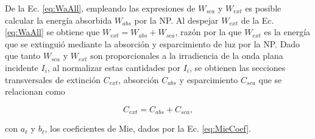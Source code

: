 De la Ec. \eqref{eq:WaAll}, empleando las expresiones de $W_{sca}$ y $W_{ext}$ es posible calcular la energía absorbida $W_{abs}$ por la NP. Al despejar $W_{ext}$ de la Ec. \eqref{eq:WaAll} se obtiene que $W_{ext} = W_{abs}+W_{sca}$, razón por la que $W_{ext}$ es la energía que se extinguió  mediante la absorción y esparcimiento de luz por la NP. Dado que tanto $W_{sca}$ y $W_{ext}$ son proporcionales a la irradiencia de la onda plana incidente $I_i$, al normalizar estas cantidades por $I_i$, se obtienen las secciones transversales de extinción $C_{ext}$, absorción  $C_{abs}$ y esparcimiento $C_{sca}$ que se relacionan como \vspace*{-.75em}
	\begin{tcolorbox}[title = {Secciones transversales de extinción, absorción y esparcimiento}, breakable ]
	\begin{equation}
	C_{ext} = C_{abs} + C_{sca},
	\end{equation}	

	con $a_\ell$ y $b_\ell$, los coeficientes de Mie, dados por la Ec. \eqref{eq:MieCoef}.
	\end{tcolorbox}\vspace*{-.75em}

